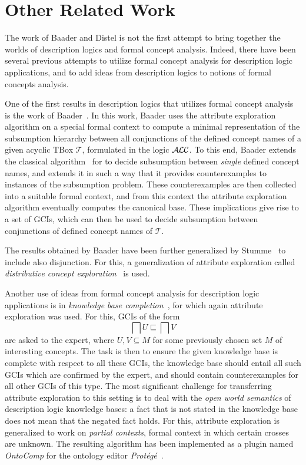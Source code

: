 \section{Other Related Work}
\label{sec:related-work}

The work of Baader and Distel is not the first attempt to bring together the worlds of
description logics and formal concept analysis.  Indeed, there have been several previous
attempts to utilize formal concept analysis for description logic applications, and to add
ideas from description logics to notions of formal concepts analysis.

One of the first results in description logics that utilizes formal concept analysis is
the work of Baader~\cite{Baader-KRUSE-95}.  In this work, Baader uses the attribute
exploration algorithm on a special formal context to compute a minimal representation of
the subsumption hierarchy between all conjunctions of the defined concept names of a given
acyclic TBox $\mathcal{T}$, formulated in the logic $\mathcal{A}\kern-0.05em\mathcal{L}\mathcal{C}$.  To this end, Baader extends
the classical algorithm~\cite{journals/ai/Schmidt-SchaussS91} for \ALC to decide
subsumption between \emph{single} defined concept names, and extends it in such a way that
it provides counterexamples to instances of the subsumption problem.  These
counterexamples are then collected into a suitable formal context, and from this context
the attribute exploration algorithm eventually computes the canonical base.  These
implications give rise to a set of GCIs, which can then be used to decide subsumption
between conjunctions of defined concept names of $\mathcal{T}$.

The results obtained by Baader have been further generalized by
Stumme~\cite{stumme96concept} to include also disjunction.  For this, a generalization of
attribute exploration called \emph{distributive concept
  exploration}~\cite{conf/ki/Stumme98} is used.

Another use of ideas from formal concept analysis for description logic applications is in
\emph{knowledge base completion}~\cite{Sert07,BGSS07}, for which again attribute
exploration was used.  For this, GCIs of the form
\begin{equation*}
  \bigsqcap U \sqsubseteq \bigsqcap V
\end{equation*}
are asked to the expert, where $U, V \subseteq M$ for some previously chosen set $M$ of
interesting concepts.  The task is then to ensure the given knowledge base is complete
with respect to all these GCIs, \ie the knowledge base should entail all such GCIs which
are confirmed by the expert, and should contain counterexamples for all other GCIs of this
type.  The most significant challenge for transferring attribute exploration to this
setting is to deal with the \emph{open world semantics} of description logic knowledge
bases: a fact that is not stated in the knowledge base does not mean that the negated fact
holds.  For this, attribute exploration is generalized to work on \emph{partial contexts},
\ie formal context in which certain crosses are unknown.  The resulting algorithm has been
implemented as a plugin named \emph{OntoComp} for the ontology editor
\emph{Protégé}~\cite{Sert09b}.

